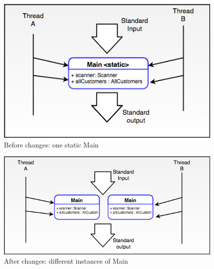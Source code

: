 \begin{minipage}[b]{0.5\textwidth}
\begin{figure}[H]
\centering
\includegraphics[scale=0.4]{res/STE-Page-1-original.png}
\caption{Before changes: one static Main}
\end{figure}
\end{minipage}
\begin{minipage}[b]{0.5\textwidth}
\begin{figure}[H]
\centering
\includegraphics[scale=0.4]{res/STE-Page-2-original.png}	
\caption{After changes: different instances of Main}
\end{figure}
\end{minipage}

